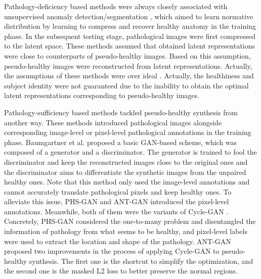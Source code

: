 \documentclass[journal,twoside,web]{ieeecolor}
\begin{document}
Pathology-deficiency based methods \cite{baur2018deep,zimmerer2019unsupervised,zimmerer2018context,chen2018unsupervised,pawlowski2018unsupervised,Baur2020ScaleSpaceAF,Baur2020SteGANomalyIC,Nguyen2020UnsupervisedRA} were always closely associated with unsupervised anomaly detection/segmentation \cite{baur2021autoencoders}, which aimed to learn normative distribution by learning to compress and recover healthy anatomy in the training phase. In the subsequent testing stage, pathological images were first compressed to the latent space. These methods assumed that obtained latent representations were close to counterparts of pseudo-healthy images. Based on this assumption, pseudo-healthy images were reconstructed from latent representations. Actually, the assumptions of these methods were over ideal \cite{chen2018unsupervised,schlegl2019f}. Actually, the healthiness and subject identity were not guaranteed due to the inability to obtain the optimal latent representations corresponding to pseudo-healthy images. 

Pathology-sufficiency based methods \cite{baumgartner2018visual,sun2020adversarial,xia2020pseudo} tackled pseudo-healthy synthesis from another way. These methods introduced pathological images alongside corresponding image-level \cite{baumgartner2018visual} or pixel-level \cite{sun2020adversarial,xia2020pseudo} pathological annotations in the training phase.  Baumgartner et al. \cite{baumgartner2018visual} proposed a basic GAN-based scheme, which was composed of a generator and a discriminator. The generator is trained to fool the discriminator and keep the reconstructed images close to the original ones and the discriminator aims to differentiate the synthetic images from the unpaired healthy ones. Note that this method only used the image-level annotations and cannot accurately translate pathological pixels and keep healthy ones. To alleviate this issue, PHS-GAN \cite{xia2020pseudo} and ANT-GAN \cite{sun2020adversarial} introduced the pixel-level annotations. Meanwhile, both of them were the variants of Cycle-GAN \cite{zhu2017unpaired}. Concretely, PHS-GAN considered the one-to-many problem and disentangled the information of pathology from what seems to be healthy, and pixel-level labels were used to extract the location and shape of the pathology. ANT-GAN proposed two improvements in the process of applying Cycle-GAN to pseudo-healthy synthesis. The first one is the shortcut to simplify the optimization,  and the second one is the masked L2 loss to better preserve the normal regions.
\end{document}
